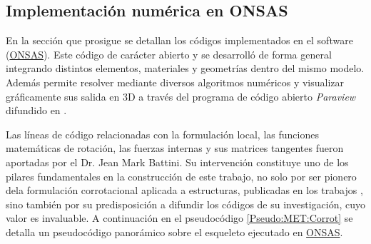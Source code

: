 \subsection{Implementación numérica en ONSAS}\label{Sec:MET:ImplementNumeric}
En la sección que prosigue se detallan los códigos implementados en el software (\href{https://github.com/ONSAS/ONSAS/}{ONSAS}). Este código de carácter abierto y se desarrolló de forma general integrando distintos elementos, materiales y geometrías dentro del mismo modelo. Además permite resolver mediante diversos algoritmos numéricos y visualizar gráficamente sus salida en 3D a través del programa de código abierto \emph{Paraview} difundido en \citep{ahrens2005paraview}.

Las líneas de código relacionadas con la formulación local, las funciones matemáticas de rotación, las fuerzas internas y sus matrices tangentes fueron aportadas por el Dr. Jean Mark Battini. Su intervención constituye uno de los pilares fundamentales en la construcción de este trabajo, no solo por ser pionero dela formulación corrotacional aplicada a estructuras, publicadas en los trabajos \citep{Battini2002} \citep{Le2014}, sino también por su predisposición a difundir los códigos de su investigación, cuyo valor es invaluable. A continuación en el pseudocódigo \ref{Pseudo:MET:Corrot} se detalla un pseudocódigo panorámico sobre el esqueleto ejecutado en \href{https://github.com/ONSAS/ONSAS/}{ONSAS}. 

